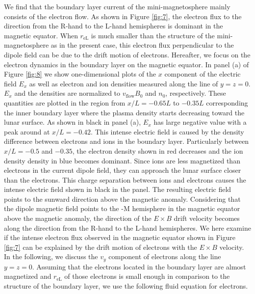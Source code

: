 \documentclass[draft,jgrga]{agutex2015}
\begin{document}
\begin{article}
We find that the boundary layer current of the mini-magnetosphere 
mainly consists of the electron flow. 
As shown in Figure \ref{fig:7}, 
the electron flux to the direction from the R-hand to the L-hand hemispheres 
is dominant in the magnetic equator.
When $r_\mathrm{eL}$ is much smaller than the structure of the
mini-magnetosphere as in the present case,
this electron flux perpendicular to the dipole field can be due to the drift motion of electrons.
Hereafter, we focus on the electron dynamics in the boundary layer on the magnetic equator.
In panel (a) of Figure \ref{fig:8} 
we show one-dimensional plots of the $x$ component of 
the electric field $E_x$ as well as
electron and ion densities measured along the line of $y=z=0$. 
$E_x$ and the densities are normalized to 
$v_\mathrm{flow} B_\mathrm{0}$ and $n_\mathrm{0}$, respectively.
These quantities are plotted in the region from $x/L = -0.65L$ to $-0.35L$
corresponding the inner boundary layer
where the plasma density starts decreasing toward the lunar surface.
As shown in black in panel (a), 
$E_x$ has large negative value with a peak around at  $x/L = -0.42 $.
This intense electric field is caused by the density difference 
between electrons and ions in the boundary layer.
Particularly between $x/L = -0.5$  and $-0.35$, 
the electron density shown in red decreases and 
the ion density density in blue becomes dominant.
Since ions are less magnetized than electrons in the current dipole field, 
they can approach the lunar surface closer than the electrons.
This charge separation between ions and electrons
causes the intense electric field shown in black in the panel.
The resulting electric field points to the sunward direction
above the magnetic anomaly.
Considering that the dipole magnetic field points
to the -M hemisphere in the magnetic equator
above the magnetic anomaly,
the direction of the $E \times B$ drift velocity becomes 
along the direction from the R-hand to the L-hand hemispheres. 
We here examine if the intense electron flux observed in the magnetic equator
shown in Figure \ref{fig:7} can be explained by the drift motion of electrons
with the $E \times B$ velocity. 
In the following, 
we discuss the $v_y$ component of electrons along the line $y=z=0$.
Assuming that the electrons located in the boundary layer 
are almost magnetized and 
$r_\mathrm{eL}$ of those electrons is small enough in comparison 
to the structure of the boundary layer, 
we use the following fluid equation for electrons.
 

\end{article}
\end{document}
